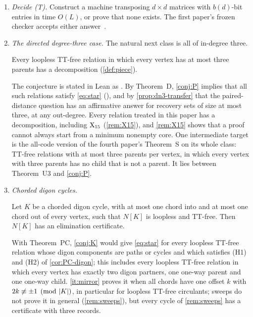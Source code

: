 \begin{enumerate}[label=\arabic*.,leftmargin=2em]
\item \emph{Decide (T).} Construct a machine transposing $d\times d$ matrices with $b(d)$-bit entries in time $O(L)$, or
prove that none exists. The first paper's frozen checker accepts either answer~\cite{FirstPaper2026}.

\item \emph{The directed degree-three case.} The natural next class is all of in-degree three.

\begin{conjecture}[Conjecture P]\label{conj:P}
Every loopless TT-free relation in which every vertex has at most three parents has a decomposition
(\cref{def:piece}).
\end{conjecture}

The conjecture is stated in Lean as . By Theorem~D, \cref{conj:P} implies that all such relations
satisfy \eqref{eq:star} (), and by \cref{prop:dn3-transfer} that the paired-distance question
has an affirmative answer for recovery sets of size at most three, at any out-degree.
Every relation treated in this paper has a decomposition, including $\mathrm{X}_{15}$ (\cref{rem:X15}), and \cref{rem:X15} shows that
a proof cannot always start from a minimum nonempty core. One intermediate target is the all-code version of the fourth paper's
Theorem~S on its whole class: TT-free relations with at most three parents per vertex, in which every vertex with three
parents has no child that is not a parent. It lies between Theorem~U3 and \cref{conj:P}.

\item \emph{Chorded digon cycles.}

\begin{conjecture}[Conjecture K]\label{conj:K}
Let $K$ be a chorded digon cycle, with at most one chord into and at most one chord out of every vertex, such that $N[K]$
is loopless and TT-free. Then $N[K]$ has an elimination certificate.
\end{conjecture}

With Theorem~PC, \cref{conj:K} would give \eqref{eq:star} for every loopless TT-free relation whose digon components are
paths or cycles and which satisfies (H1) and (H2) of \cref{cor:PC-digon}; this includes every loopless TT-free relation in
which every vertex has exactly two digon partners, one one-way parent and one one-way child. \ref{it:mirror} proves it
when all chords have one offset $k$ with $2k\not\equiv\pm1\pmod{\lvert K \rvert}$, in particular for loopless TT-free
circulants; sweeps do not prove it in general (\cref{rem:sweeps}), but every cycle of \cref{rem:sweeps} has a
certificate with three records.


\end{enumerate}
